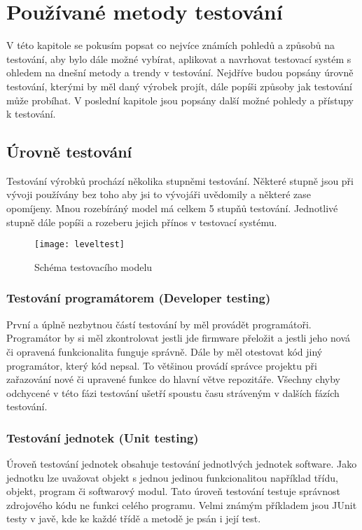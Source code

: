 \chapter{Používané metody testování}
V této kapitole se pokusím popsat co nejvíce známích pohledů a způsobů na testování, aby bylo dále možné vybírat, aplikovat a navrhovat testovací systém s ohledem na dnešní metody a trendy v testování. Nejdříve budou popsány úrovně testování, kterými by měl daný výrobek projít, dále popíši způsoby jak testování může probíhat. V poslední kapitole jsou popsány další možné pohledy a přístupy k testování.

\section{Úrovně testování}
Testování výrobků prochází několika stupněmi testování. Některé stupně jsou při vývoji používány bez toho aby jsi to vývojáři uvědomily a některé zase opomíjeny. Mnou rozebíráný model má celkem 5 stupňů testování.  Jednotlivé stupně dále popíši a rozeberu jejich přínos v testovací systému.

\begin{figure}[h]
  \centering
  \texttt{[image: leveltest]}
  \caption{Schéma testovacího modelu}
  \label{fig:router}
\end{figure}

\subsection{Testování programátorem (Developer testing)}
První a úplně nezbytnou částí testování by měl provádět programátoři. Programátor by si měl zkontrolovat jestli jde firmware přeložit a jestli jeho nová či opravená funkcionalita funguje správně. Dále by měl otestovat kód jiný programátor, který kód nepsal. To většinou provádí správce projektu při zařazování nové či upravené funkce do hlavní větve repozitáře. Všechny chyby odchycené v této fázi testování ušetří spoustu času stráveným v dalších fázích testování.

\subsection{Testování jednotek (Unit testing)}
Úroveň testování jednotek obsahuje testování jednotlvých jednotek software. Jako jednotku lze uvažovat objekt s jednou jedinou funkcionalitou například třídu, objekt, program či softwarový modul. Tato úroveň testování testuje správnost zdrojového kódu ne funkci celého programu. Velmi známým příkladem jsou JUnit testy v javě, kde ke každé třídě a metodě je psán i její test.


